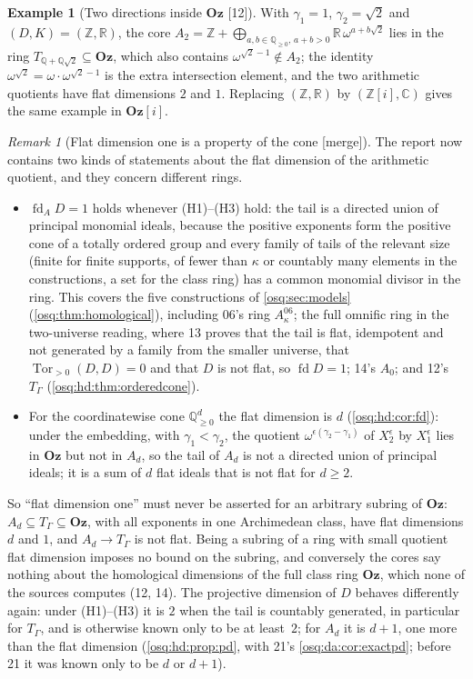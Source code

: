 \documentclass[11pt,letterpaper]{article}
\numberwithin{equation}{section}
\theoremstyle{definition}
\newtheorem{example}[example]{Example}
\theoremstyle{remark}
\newtheorem{remark}[remark]{Remark}
\theoremstyle{plain}
\newcommand{\Oz}{\mathbf{Oz}}
\newcommand{\GOz}{\Oz[i]}
\newcommand{\Z}{\mathbb Z}
\newcommand{\Q}{\mathbb Q}
\newcommand{\R}{\mathbb R}
\newcommand{\C}{\mathbb C}
\newcommand{\Tor}{\operatorname{Tor}}
\newcommand{\fd}{\operatorname{fd}}
\newcommand{\src}[1]{\textup{\textsf{[#1]}}}
\newcommand{\merge}{\textup{\textsf{[merge]}}}
\begin{document}
\begin{example}[Two directions inside $\Oz$ \src{12}]\label{osq:hd:ex:cone}
With $\gamma_1=1$, $\gamma_2=\sqrt2$ and $(D,K)=(\Z,\R)$, the core $A_2=\Z+\bigoplus_{a,b\in\Q_{\ge0},\,a+b>0}\R\,\omega^{a+b\sqrt2}$
lies in the ring $T_{\Q+\Q\sqrt2}\subseteq\Oz$, which also contains $\omega^{\sqrt2-1}\notin A_2$; the identity
$\omega^{\sqrt2}=\omega\cdot\omega^{\sqrt2-1}$ is the extra intersection element, and the two arithmetic quotients have flat
dimensions $2$ and $1$. Replacing $(\Z,\R)$ by $(\Z[i],\C)$ gives the same example in $\GOz$.
\end{example}

\begin{remark}[Flat dimension one is a property of the cone \merge]\label{osq:hd:rem:reconcile}
The report now contains two kinds of statements about the flat dimension of the arithmetic quotient, and they concern
different rings.
\begin{itemize}
\item $\fd_AD=1$ holds whenever (H1)--(H3) hold: the tail is a directed union of principal monomial ideals, because the
positive exponents form the positive cone of a totally ordered group and every family of tails of the relevant size
(finite for finite supports, of fewer than $\kappa$ or countably many elements in the constructions, a set for the class ring)
has a common monomial divisor in the ring. This covers the five constructions of \cref{osq:sec:models}
(\cref{osq:thm:homological}), including 06's ring $A^{06}_\kappa$; the full omnific ring in the two-universe reading, where
13 proves that the tail is flat, idempotent and not generated by a family from the smaller universe, that
$\Tor_{>0}(D,D)=0$ and that $D$ is not flat, so $\fd D=1$; 14's $A_0$; and 12's $T_\Gamma$
(\cref{osq:hd:thm:orderedcone}).
\item For the coordinatewise cone $\Q_{\ge0}^d$ the flat dimension is $d$ (\cref{osq:hd:cor:fd}): under the embedding, with
$\gamma_1<\gamma_2$, the quotient $\omega^{\epsilon(\gamma_2-\gamma_1)}$ of $X_2^\epsilon$ by $X_1^\epsilon$ lies in $\Oz$ but not in
$A_d$, so the tail of $A_d$ is not a directed union of principal ideals; it is a sum of $d$ flat ideals that is not flat for
$d\ge2$.
\end{itemize}
So ``flat dimension one'' must never be asserted for an arbitrary subring of $\Oz$: $A_d\subseteq T_\Gamma\subseteq\Oz$, with all exponents
in one Archimedean class, have flat dimensions $d$ and $1$, and $A_d\to T_\Gamma$ is not flat. Being a subring of a ring with small
quotient flat dimension imposes no bound on the subring, and conversely the cores say nothing about the homological dimensions of
the full class ring $\Oz$, which none of the sources computes (12, 14). The projective dimension of $D$ behaves differently
again: under (H1)--(H3) it is $2$ when the tail is countably generated, in particular for $T_\Gamma$, and is otherwise known only
to be at least~$2$; for $A_d$ it is $d+1$, one more than the flat dimension (\cref{osq:hd:prop:pd}, with 21's
\cref{osq:da:cor:exactpd}; before 21 it was known only to be $d$ or $d+1$).
\end{remark}
\end{document}
